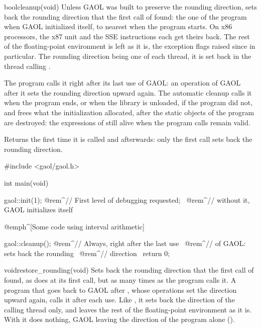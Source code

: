 \documentclass[12pt,a4paper,twoside,openright]{book}
\begin{document}
\begin{deffun}{bool}{cleanup}{(void)}
Unless GAOL was built to preserve the rounding direction, sets back the
rounding direction that the first call of  found: the one of the
program when GAOL initialized itself, to nearest when the program starts. On
x86 processors, the x87 unit and the SSE instructions each get theirs back.
The rest of the floating-point environment is left as it is, the exception
flags raised since in particular. The rounding direction being one of each
thread, it is set back in the thread calling .\newinvfive

The program calls it right after its last use of GAOL: an operation of GAOL
after it sets the rounding direction upward again. The automatic cleanup
calls it when the program ends, or when the library is unloaded, if the
program did not, and frees what the initialization allocated, after the
static objects of the program are destroyed: the expressions of
 still alive when the program calls
 remain valid.

Returns  the first time it is called and  afterwards:
only the first call sets back the rounding direction.
\end{deffun}

\begin{example}
#include <gaol/gaol.h>

int main(void)
{
  gaol::init(1); @rem^// First level of debugging requested;~
                 @rem^// without it, GAOL initializes itself~

  @emph^[Some code using interval arithmetic]~

  gaol::cleanup(); @rem^// Always, right after the last use~
                   @rem^// of GAOL: sets back the rounding~
                   @rem^// direction~
  return 0;
}
\end{example}

\begin{deffun}{void}{restore\_rounding}{(void)}
Sets back the rounding direction that the first call of  found,
as  does at its first call, but as many times as the program
calls it.\newinvfive{} A program that goes back to GAOL after
, whose operations set the direction upward again, calls it
after each use. Like , it sets back the direction of the
calling thread only, and leaves the rest of the floating-point environment as
it is. With  it does nothing, GAOL leaving
the direction of the program alone ().
\end{deffun}
\end{document}
